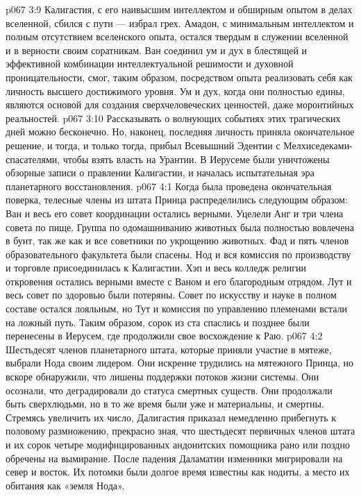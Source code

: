 \vs p067 3:9 Калигастия, с его наивысшим интеллектом и обширным опытом в делах вселенной, сбился с пути --- избрал грех. Амадон, с минимальным интеллектом и полным отсутствием вселенского опыта, остался твердым в служении вселенной и в верности своим соратникам. Ван соединил ум и дух в блестящей и эффективной комбинации интеллектуальной решимости и духовной проницательности, смог, таким образом, посредством опыта реализовать себя как личность высшего достижимого уровня. Ум и дух, когда они полностью едины, являются основой для создания сверхчеловеческих ценностей, даже моронтийных реальностей.
\vs p067 3:10 Рассказывать о волнующих событиях этих трагических дней можно бесконечно. Но, наконец, последняя личность приняла окончательное решение, и тогда, и только тогда, прибыл Всевышний Эдентии с Мелхиседеками\hyp{}спасателями, чтобы взять власть на Урантии. В Иерусеме были уничтожены обзорные записи о правлении Калигастии, и началась испытательная эра планетарного восстановления.
\vs p067 4:1 Когда была проведена окончательная поверка, телесные члены из штата Принца распределились следующим образом: Ван и весь его совет координации остались верными. Уцелели Анг и три члена совета по пище. Группа по одомашниванию животных была полностью вовлечена в бунт, так же как и все советники по укрощению животных. Фад и пять членов образовательного факультета были спасены. Нод и вся комиссия по производству и торговле присоединилась к Калигастии. Хэп и весь колледж религии откровения остались верными вместе с Ваном и его благородным отрядом. Лут и весь совет по здоровью были потеряны. Совет по искусству и науке в полном составе остался лояльным, но Тут и комиссия по управлению племенами встали на ложный путь. Таким образом, сорок из ста спаслись и позднее были перенесены в Иерусем, где продолжили свое восхождение к Раю.
\vs p067 4:2 Шестьдесят членов планетарного штата, которые приняли участие в мятеже, выбрали Нода своим лидером. Они искренне трудились на мятежного Принца, но вскоре обнаружили, что лишены поддержки потоков жизни системы. Они осознали, что деградировали до статуса смертных существ. Они продолжали быть сверхлюдьми, но в то же время были уже и материальны, и смертны. Стремясь увеличить их число, Далигастия приказал немедленно прибегнуть к половому размножению, прекрасно зная, что шестьдесят первичных членов штата и их сорок четыре модифицированных андонитских помощника рано или поздно обречены на вымирание. После падения Даламатии изменники мигрировали на север и восток. Их потомки были долгое время известны как нодиты, а место их обитания как «земля Нода».
